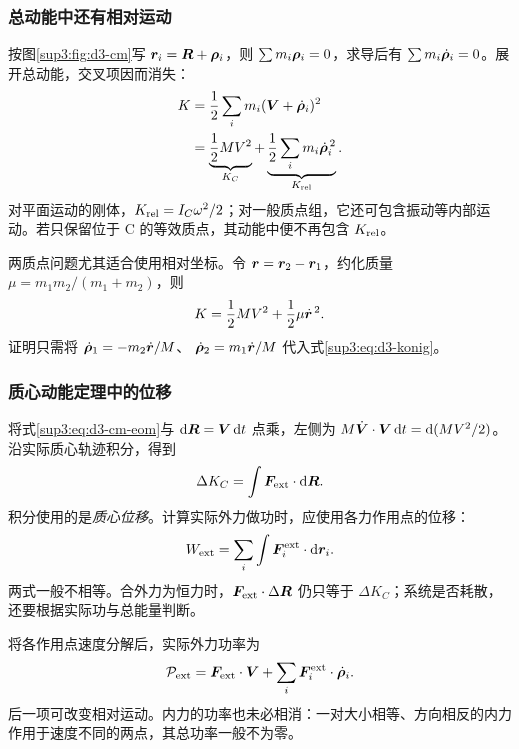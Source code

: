 \subsubsection{总动能中还有相对运动}
按图\ref{sup3:fig:d3-cm}写 $\bm{r}_i=\bm{R}+\bm{\rho}_i$，则
$\sum m_i\bm{\rho}_i=0$，求导后有 $\sum m_i\dot{\bm{\rho}}_i=0$。展开总动能，交叉项因而消失：
\begin{align}
K&=\frac12\sum_i m_i(\bm{V}+\dot{\bm{\rho}}_i)^2\notag\\
 &=\underbrace{\frac12MV^2}_{K_C}
 +\underbrace{\frac12\sum_i m_i\dot{\bm{\rho}}_i^{\,2}}_{K_{\rm rel}}.
\label{sup3:eq:d3-konig}
\end{align}
对平面运动的刚体，$K_{\rm rel}=I_C\omega^2/2$；对一般质点组，它还可包含振动等内部运动。若只保留位于 C 的等效质点，其动能中便不再包含 $K_{\rm rel}$。

两质点问题尤其适合使用相对坐标。令 $\bm{r}=\bm{r}_2-\bm{r}_1$，约化质量 $\mu=m_1m_2/(m_1+m_2)$，则
\begin{equation}
K=\frac12MV^2+\frac12\mu\dot{\bm{r}}^{\,2}.
\label{sup3:eq:d3-reduced}
\end{equation}
证明只需将 $\dot{\bm{\rho}}_1=-m_2\dot{\bm{r}}/M$、
$\dot{\bm{\rho}}_2=m_1\dot{\bm{r}}/M$ 代入式\eqref{sup3:eq:d3-konig}。

\subsubsection{质心动能定理中的位移}
将式\eqref{sup3:eq:d3-cm-eom}与 $\mathop{}\!\mathrm d\bm{R}=\bm{V}\mathop{}\!\mathrm d t$ 点乘，左侧为 $M\dot{\bm{V}}\cdot\bm{V}\mathop{}\!\mathrm d t=\mathop{}\!\mathrm d(MV^2/2)$。沿实际质心轨迹积分，得到
\begin{equation}
\Delta K_C=\int\bm{F}_{\rm ext}\cdot\mathop{}\!\mathrm d\bm{R}.
\label{sup3:eq:d3-pseudowork}
\end{equation}
积分使用的是\emph{质心位移}。计算实际外力做功时，应使用各力作用点的位移：
\begin{equation}
W_{\rm ext}=\sum_i\int\bm{F}_i^{\rm ext}\cdot\mathop{}\!\mathrm d\bm{r}_i.
\end{equation}
两式一般不相等。合外力为恒力时，$\bm{F}_{\rm ext}\cdot\Delta\bm{R}$ 仍只等于 $\Delta K_C$；系统是否耗散，还要根据实际功与总能量判断。

将各作用点速度分解后，实际外力功率为
\[
\mathcal P_{\rm ext}=\bm{F}_{\rm ext}\cdot\bm{V}
 +\sum_i\bm{F}_i^{\rm ext}\cdot\dot{\bm{\rho}}_i.
\]
后一项可改变相对运动。内力的功率也未必相消：一对大小相等、方向相反的内力作用于速度不同的两点，其总功率一般不为零。

